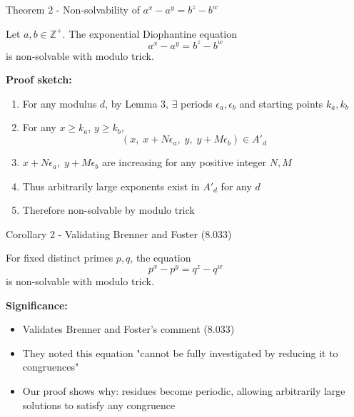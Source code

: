 \begin{frame}{Theorem 2 - Non-solvability of $a^x-a^y = b^z-b^w$}
    \begin{theorems}
        Let $a,b \in \mathbb{Z}^+$. The exponential Diophantine equation
        \[a^x - a^y = b^z - b^w\]
        is non-solvable with modulo trick.
    \end{theorems}
    
    \textbf{Proof sketch:}
    \begin{enumerate}
        \item For any modulus $d$, by Lemma 3, $\exists$ periods $\epsilon_a,\epsilon_b$ and starting points $k_a,k_b$
        \item For any $x \geq k_a$, $y \geq k_b$, 
            \[(x,\; x+N\epsilon_a,\; y,\; y+M\epsilon_b) \in A'_d\]
        \item $x+N\epsilon_a,\;y+M\epsilon_b $ are increasing for any positive integer $N,M$
        \item Thus arbitrarily large exponents exist in $A'_d$ for any $d$
        \item Therefore non-solvable by modulo trick
    \end{enumerate}
\end{frame}

\begin{frame}{Corollary 2 - Validating Brenner and Foster (8.033)}
    \begin{corollarys}
        For fixed distinct primes $p,q$, the equation
        \[p^x - p^y = q^z - q^w\]
        is non-solvable with modulo trick.
    \end{corollarys}
    
    \vspace{0.3cm}
    \textbf{Significance:}
    \begin{itemize}
        \item Validates Brenner and Foster's comment (8.033)
        \item They noted this equation "cannot be fully investigated by reducing it to congruences"
        \item Our proof shows why: residues become periodic, allowing arbitrarily large solutions to satisfy any congruence
    \end{itemize}
\end{frame}

